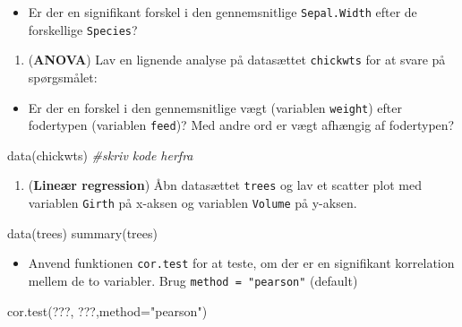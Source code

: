 \documentclass[
]{book}
\newenvironment{Shaded}{\begin{snugshade}}{\end{snugshade}}
\newcommand{\AttributeTok}[1]{\textcolor[rgb]{0.77,0.63,0.00}{#1}}
\newcommand{\CommentTok}[1]{\textcolor[rgb]{0.56,0.35,0.01}{\textit{#1}}}
\newcommand{\FunctionTok}[1]{\textcolor[rgb]{0.00,0.00,0.00}{#1}}
\newcommand{\NormalTok}[1]{#1}
\newcommand{\StringTok}[1]{\textcolor[rgb]{0.31,0.60,0.02}{#1}}
\providecommand{\tightlist}{%
  \setlength{\itemsep}{0pt}\setlength{\parskip}{0pt}}
\begin{document}
\begin{itemize}
\tightlist
\item
  Er der en signifikant forskel i den gennemsnitlige \texttt{Sepal.Width} efter de forskellige \texttt{Species}?
\end{itemize}

\begin{enumerate}
\def\labelenumi{\arabic{enumi})}
\setcounter{enumi}{15}
\tightlist
\item
  (\textbf{ANOVA}) Lav en lignende analyse på datasættet \texttt{chickwts} for at svare på spørgsmålet:
\end{enumerate}

\begin{itemize}
\tightlist
\item
  Er der en forskel i den gennemsnitlige vægt (variablen \texttt{weight}) efter fodertypen (variablen \texttt{feed})? Med andre ord er vægt afhængig af fodertypen?
\end{itemize}

\begin{Shaded}
\begin{Highlighting}[]
\FunctionTok{data}\NormalTok{(chickwts)}
\CommentTok{\#skriv kode herfra}
\end{Highlighting}
\end{Shaded}

\begin{enumerate}
\def\labelenumi{\arabic{enumi})}
\setcounter{enumi}{16}
\tightlist
\item
  (\textbf{Lineær regression}) Åbn datasættet \texttt{trees} og lav et scatter plot med variablen \texttt{Girth} på x-aksen og variablen \texttt{Volume} på y-aksen.
\end{enumerate}

\begin{Shaded}
\begin{Highlighting}[]
\FunctionTok{data}\NormalTok{(trees)}
\FunctionTok{summary}\NormalTok{(trees)}
\end{Highlighting}
\end{Shaded}

\begin{itemize}
\tightlist
\item
  Anvend funktionen \texttt{cor.test} for at teste, om der er en signifikant korrelation mellem de to variabler. Brug \texttt{method\ =\ "pearson"} (default)
\end{itemize}

\begin{Shaded}
\begin{Highlighting}[]
\FunctionTok{cor.test}\NormalTok{(???, ???,}\AttributeTok{method=}\StringTok{"pearson"}\NormalTok{)}
\end{Highlighting}
\end{Shaded}
\end{document}
